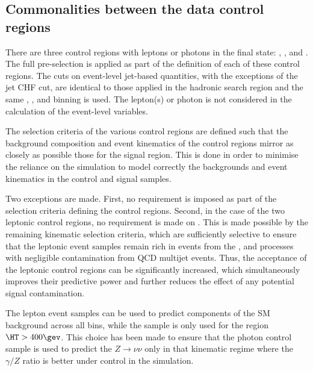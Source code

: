
\subsection{Commonalities between the data control regions}

There are three control regions with leptons or photons in the final
state: \mj, \mmj, and \gj. 
The full pre-selection is applied as part of the definition of each of these control
regions. The cuts on event-level jet-based quantities, with the exceptions of the jet CHF cut, 
are identical to those applied in the hadronic search region and the same \njet, \nb,
and \scalht binning is used. The lepton(s) or photon is not considered
in the calculation of the event-level variables.

The selection criteria of the various control regions are defined such
that the background composition and event kinematics of the control
regions mirror as closely as possible those for the signal
region. This is done in order to minimise the reliance on the
simulation to model correctly the backgrounds and event kinematics in
the control and signal samples.

Two exceptions are made. First, no \bdphi requirement is imposed as
part of the selection criteria defining the control regions. Second,
in the case of the two leptonic control regions, no requirement is
made on \alphat. This is made possible by the remaining kinematic
selection criteria, which are sufficiently selective to ensure that
the leptonic event samples remain rich in events from the \wj, \ttbar
and \zll processes with negligible contamination from QCD multijet
events. Thus, the acceptance of the leptonic control regions can be
significantly increased, which simultaneously improves their
predictive power and further reduces the effect of any potential
signal contamination.

The lepton event samples can be used to predict components of the SM
background across all \scalht bins, while the \gj sample is only 
used for the region $\HT > 400\gev$. 
This choice has been made to ensure that the photon control sample 
is used to predict the $Z\rightarrow\nu\nu$ only in that 
kinematic regime where the $\gamma/Z$ ratio is better under control in the simulation. 

